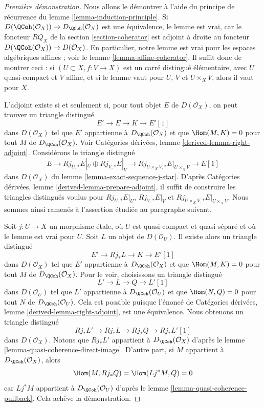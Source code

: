 \begin{proof}[Première démonstration]
Nous allons le démontrer à l'aide du principe de récurrence du
lemme \ref{lemma-induction-principle}.
Si $D(\QCoh(\mathcal{O}_X)) \to D_\QCoh(\mathcal{O}_X)$
est une équivalence, le lemme est vrai, car le foncteur
$RQ_X$ de la section \ref{section-coherator} est adjoint à droite au foncteur
$D(\QCoh(\mathcal{O}_X)) \to D(\mathcal{O}_X)$.
En particulier, notre lemme est vrai pour les espaces algébriques affines ; voir le
lemme \ref{lemma-affine-coherator}.
Il suffit donc de montrer ceci : si $(U \subset X, f : V \to X)$
est un carré distingué élémentaire, avec $U$ quasi-compact
et $V$ affine, et si le lemme vaut pour $U$, $V$ et $U \times_X V$,
alors il vaut pour $X$.

\medskip\noindent
L'adjoint existe si et seulement si, pour tout objet $E$ de
$D(\mathcal{O}_X)$, on peut trouver un triangle distingué
$$
E' \to E \to K \to E'[1]
$$
dans $D(\mathcal{O}_X)$
tel que $E'$ appartienne à $D_\QCoh(\mathcal{O}_X)$ et que
$\Hom(M, K) = 0$ pour tout $M$ de $D_\QCoh(\mathcal{O}_X)$. Voir
Catégories dérivées, lemme \ref{derived-lemma-right-adjoint}.
Considérons le triangle distingué
$$
E \to Rj_{U, *}E|_U \oplus Rj_{V, *}E|_V \to
Rj_{U \times_X V, *}E|_{U \times_X V} \to E[1]
$$
dans $D(\mathcal{O}_X)$ du lemme \ref{lemma-exact-sequence-j-star}.
D'après Catégories dérivées, lemme \ref{derived-lemma-prepare-adjoint},
il suffit de construire les triangles distingués voulus
pour $Rj_{U, *}E|_U$, $Rj_{V, *}E|_V$ et
$Rj_{U \times_X V, *}E|_{U \times_X V}$. Nous sommes ainsi ramenés à l'assertion
étudiée au paragraphe suivant.

\medskip\noindent
Soit $j : U \to X$ un morphisme étale, où
$U$ est quasi-compact et quasi-séparé et où le lemme est vrai pour $U$.
Soit $L$ un objet de $D(\mathcal{O}_U)$.
Il existe alors un triangle distingué
$$
E' \to Rj_*L \to K \to E'[1]
$$
dans $D(\mathcal{O}_X)$
tel que $E'$ appartienne à $D_\QCoh(\mathcal{O}_X)$ et que
$\Hom(M, K) = 0$ pour tout $M$ de $D_\QCoh(\mathcal{O}_X)$.
Pour le voir, choisissons un triangle distingué
$$
L' \to L \to Q \to L'[1]
$$
dans $D(\mathcal{O}_U)$ tel que $L'$ appartienne à $D_\QCoh(\mathcal{O}_U)$
et que $\Hom(N, Q) = 0$ pour tout $N$ de $D_\QCoh(\mathcal{O}_U)$.
Cela est possible puisque l'énoncé de
Catégories dérivées, lemme \ref{derived-lemma-right-adjoint},
est une équivalence.
Nous obtenons un triangle distingué
$$
Rj_*L' \to Rj_*L \to Rj_*Q \to Rj_*L'[1]
$$
dans $D(\mathcal{O}_X)$. Notons que $Rj_*L'$ appartient à $D_\QCoh(\mathcal{O}_X)$
d'après le lemme \ref{lemma-quasi-coherence-direct-image}.
D'autre part, si $M$ appartient à $D_\QCoh(\mathcal{O}_X)$, alors
$$
\Hom(M, Rj_*Q) = \Hom(Lj^*M, Q) = 0
$$
car $Lj^*M$ appartient à $D_\QCoh(\mathcal{O}_U)$ d'après le
lemme \ref{lemma-quasi-coherence-pullback}.
Cela achève la démonstration.
\end{proof}

